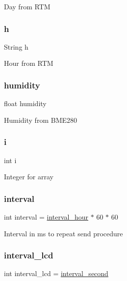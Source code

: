 Day from R\+TM \mbox{\label{_w_s_8ino_a5977e838367785a7176dc7d4106df5e3}} 
\subsubsection{\texorpdfstring{h}{h}}
{\footnotesize\ttfamily String h}

Hour from R\+TM \mbox{\label{_w_s_8ino_a6a87b2b0cff24d38b367ccd34843a206}} 
\subsubsection{\texorpdfstring{humidity}{humidity}}
{\footnotesize\ttfamily float humidity}

Humidity from B\+M\+E280 \mbox{\label{_w_s_8ino_acb559820d9ca11295b4500f179ef6392}} 
\subsubsection{\texorpdfstring{i}{i}}
{\footnotesize\ttfamily int i}

Integer for array \mbox{\label{_w_s_8ino_ae0c690118932b32ef40a74bb6a259acd}} 
\subsubsection{\texorpdfstring{interval}{interval}}
{\footnotesize\ttfamily int interval = \hyperlink{_w_s_8ino_a4e07ce7aef83b2e94bd353d77029423e}{interval\+\_\+hour} $\ast$ 60 $\ast$ 60}

Interval in ms to repeat send procedure \mbox{\label{_w_s_8ino_a64d680b4be82b34d0731c9dd84986ead}} 
\subsubsection{\texorpdfstring{interval\+\_\+lcd}{interval\_lcd}}
{\footnotesize\ttfamily int interval\+\_\+lcd = \hyperlink{_w_s_8ino_a0a56e85c196bfb2b3bf61abe7f007541}{interval\+\_\+second}}

